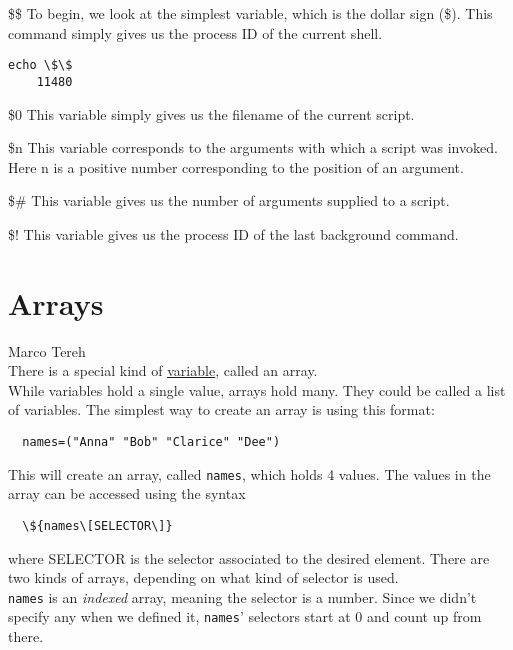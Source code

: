 \documentclass[hidelinks,12pt,a4paper,numbers=enddot]{scrartcl}
\begin{document}
\$\$
To begin, we look at the simplest variable, which is the dollar sign (\$).
This command simply gives us the process ID of the current shell.\\

\begin{verbatim}
echo \$\$
    11480
\end{verbatim}

\$0
This variable simply gives us the filename of the current script.

\$n
This variable corresponds to the arguments with which a script was invoked.
Here n is a positive number corresponding to the position of an argument.

\$\#
This variable gives us the number of arguments supplied to a script.

\$!
This variable gives us the process ID of the last background command.

\section{Arrays}


\large Marco Tereh \normalsize\\



There is a special kind of \underline{\href{variables.html}{variable}}, called an array.\\

While variables hold a single value, arrays hold many. They could be called a list of variables.
The simplest way to create an array is using this format:

\begin{verbatim}
  names=("Anna" "Bob" "Clarice" "Dee")
\end{verbatim}

This will create an array, called \texttt{names}, which holds 4 values.
The values in the array can be accessed using the syntax

\begin{verbatim}
  \${names\[SELECTOR\]}
\end{verbatim}

where SELECTOR is the selector associated to the desired element. There are two kinds of
arrays, depending on what kind of selector is used.\\

\texttt{names} is an \emph{indexed} array, meaning the selector is a number.
Since we didn't specify any when we defined it, \texttt{names}' selectors start at
0 and count up from there.\\
\end{document}
